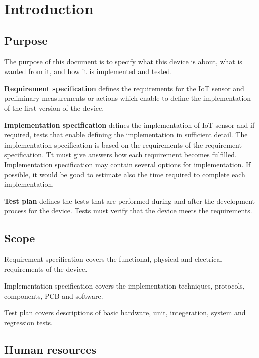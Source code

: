 \documentclass[]{dithesis}
\begin{document}
\chapter{Introduction}
\setcounter{page}{5} %
%


\section{Purpose}

The purpose of this document is to specify what this device is about, what is wanted from it, and how it is
implemented and tested.

\textbf{Requirement specification} defines the requirements for the IoT sensor and preliminary measurements or actions which enable to define the implementation of the first version of the
device.

\textbf{Implementation specification} defines the implementation of IoT sensor and if required, tests that enable defining the implementation in sufficient detail. The implementation specification is based on the requirements of the requirement specification. Tt must give answers how each requirement becomes fulfilled. Implementation specification may contain several options for implementation. If possible, it would be good to estimate also the time required to complete each implementation.

\textbf{Test plan} defines the tests that are performed during and after the development process for the device. Tests must verify that the device meets the requirements.

\section{Scope}

Requirement specification covers the functional, physical and electrical requirements of the device.

Implementation specification covers the implementation techniques, protocols, components, PCB and
software.

Test plan covers descriptions of basic hardware, unit, integeration, system and regression tests.

\section{Human resources}
\end{document}
